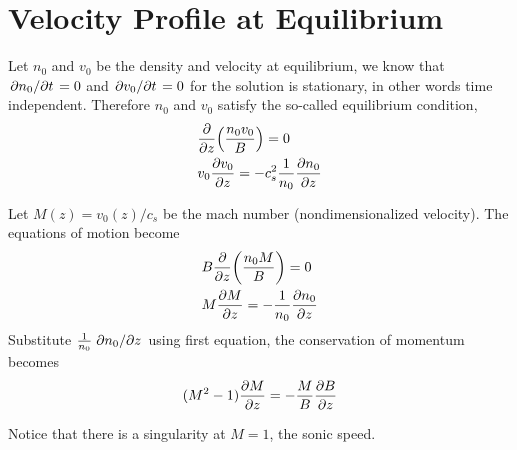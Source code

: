 \section{Velocity Profile at Equilibrium}
Let $n_0$ and $v_0$ be the density and velocity at equilibrium, we know that $\pdv*{n_0}{t}=0$ and $\pdv*{v_0}{t}=0$ for the solution is stationary, in other words time independent. Therefore $n_0$ and $v_0$ satisfy the so-called equilibrium condition,
\begin{align*}
     & \pdv{z}(\frac{n_0v_0}{B}) = 0                     \\
     & v_0\pdv{v_0}{z} = -c_s^2\frac{1}{n_0}\pdv{n_0}{z}
\end{align*}

Let $M(z) = v_0(z)/c_s$ be the mach number (nondimensionalized velocity). The equations of motion become
\begin{align*}
     & B\pdv{z}(\frac{n_0M}{B}) = 0             \\
     & M\pdv{M}{z} = -\frac{1}{n_0}\pdv{n_0}{z}
\end{align*}
Substitute $\frac{1}{n_0}\pdv*{n_0}{z}$ using first equation, the conservation of momentum becomes
\[ (M^2-1)\pdv{M}{z} = -\frac{M}{B}\pdv{B}{z} \]

Notice that there is a singularity at $M=1$, the sonic speed.

